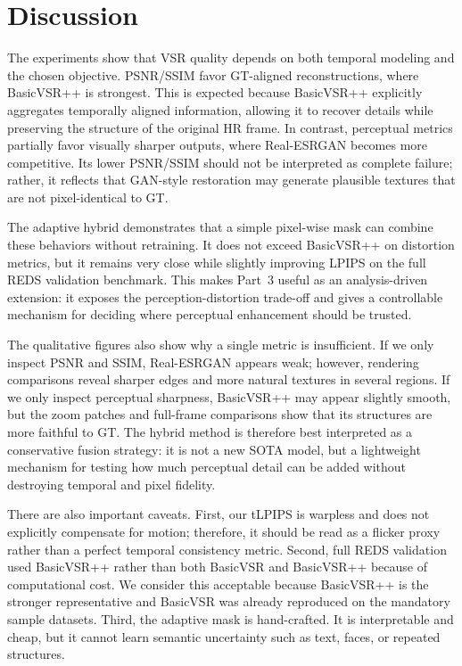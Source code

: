 \section{Discussion}
The experiments show that VSR quality depends on both temporal modeling and the chosen objective. PSNR/SSIM favor GT-aligned reconstructions, where BasicVSR++ is strongest. This is expected because BasicVSR++ explicitly aggregates temporally aligned information, allowing it to recover details while preserving the structure of the original HR frame. In contrast, perceptual metrics partially favor visually sharper outputs, where Real-ESRGAN becomes more competitive. Its lower PSNR/SSIM should not be interpreted as complete failure; rather, it reflects that GAN-style restoration may generate plausible textures that are not pixel-identical to GT.

The adaptive hybrid demonstrates that a simple pixel-wise mask can combine these behaviors without retraining. It does not exceed BasicVSR++ on distortion metrics, but it remains very close while slightly improving LPIPS on the full REDS validation benchmark. This makes Part~3 useful as an analysis-driven extension: it exposes the perception-distortion trade-off and gives a controllable mechanism for deciding where perceptual enhancement should be trusted.

The qualitative figures also show why a single metric is insufficient. If we only inspect PSNR and SSIM, Real-ESRGAN appears weak; however, rendering comparisons reveal sharper edges and more natural textures in several regions. If we only inspect perceptual sharpness, BasicVSR++ may appear slightly smooth, but the zoom patches and full-frame comparisons show that its structures are more faithful to GT. The hybrid method is therefore best interpreted as a conservative fusion strategy: it is not a new SOTA model, but a lightweight mechanism for testing how much perceptual detail can be added without destroying temporal and pixel fidelity.

There are also important caveats. First, our tLPIPS is warpless and does not explicitly compensate for motion; therefore, it should be read as a flicker proxy rather than a perfect temporal consistency metric. Second, full REDS validation used BasicVSR++ rather than both BasicVSR and BasicVSR++ because of computational cost. We consider this acceptable because BasicVSR++ is the stronger representative and BasicVSR was already reproduced on the mandatory sample datasets. Third, the adaptive mask is hand-crafted. It is interpretable and cheap, but it cannot learn semantic uncertainty such as text, faces, or repeated structures.

